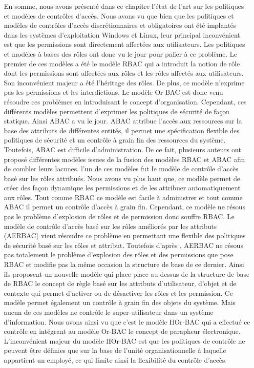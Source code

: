 En somme, nous avons présenté dans ce chapitre l'état de l'art sur les politiques et modèles de contrôles d'accès. Nous avons vu que bien que les politiques et modèles de contrôles d'accès discrétionnaires et obligatoires ont été implantés dans les systèmes d'exploitation Windows et Linux, leur principal inconvénient est que les permissions sont directement affectées aux utilisateurs. Les politiques
et modèles à bases des rôles ont donc vu le jour pour palier à ce problème. Le premier de ces modèles a été le modèle RBAC qui a introduit la notion de rôle dont les permissions sont affectées aux rôles et les rôles affectés aux utilisateurs. Son inconvénient majeur a été l'héritage des rôles. De plus, ce modèle n'exprime pas les permissions et les interdictions. Le modèle Or-BAC est donc venu résoudre ces
problèmes en introduisant le concept d'organisation. Cependant, ces différents modèles permettent d'exprimer les politiques de sécurité de façon statique. Ainsi ABAC a vu le jour. ABAC attribue l'accès aux ressources sur la base des attributs de différentes entités, il permet une spécification flexible des politiques de sécurité et un contrôle à grain fin des ressources du système. Toutefois, ABAC est difficile d'administration. De ce fait, plusieurs auteurs ont proposé différentes modèles issues de la fusion des modèles RBAC et ABAC afin de combler leurs lacunes. l'un de ces modèles fut le modèle de contrôle d'accès basé sur les rôles attribués. Nous avons vu plus haut que, ce modèle permet de créer des façon dynamique les permissions et de les attribuer automatiquement aux rôles. Tout comme RBAC ce modèle est facile à administrer et tout comme ABAC il permet un contrôle d'accès à grain fin. Cependant, ce modèle ne résous pas le problème d'explosion de rôles et de permission donc souffre RBAC. Le modèle de contrôle d'accès basé sur les rôles améliorés par les attributs (AERBAC) vient résoudre ce problème en permettant une flexible des politiques de sécurité basé sur les rôles et attribut. Toutefois d'après \cite{singh19}, AERBAC ne résous pas totalement le problème d'explosion des rôles et des permissions que pose RBAC et modifie pas la même occasion la structure de base de ce dernier. Ainsi ils proposent un nouvelle modèle qui place place au dessus de la structure de base de RBAC le concept de règle basé sur les attributs d'utilisateur, d'objet et de contexte qui permet d'activer ou de désactiver les rôles et les permission. Ce modèle permet également un contrôle à grain fin des objets du système. Mais aucun de ces modèles ne contrôle le super-utilisateur dans un système d'information. Nous avons ainsi vu que c'est le modèle HOr-BAC qui a effectué ce contrôle en intégrant au modèle Or-BAC le concept de parapheur électronique. L'inconvénient majeur du modèle HOr-BAC est que les politiques de contrôle ne peuvent être définies que sur la base de l'unité organisationnelle à laquelle appartient un employé, ce qui limite ainsi la flexibilité du contrôle d'accès.

